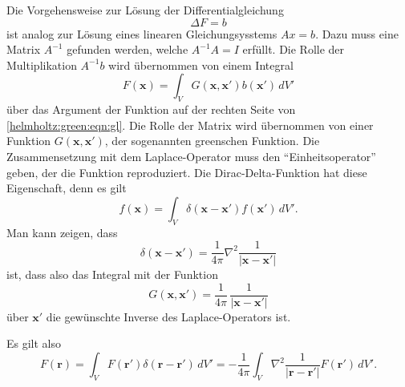 Die Vorgehensweise zur Lösung der Differentialgleichung
\begin{equation}
\Delta F = b
\label{helmholtz:green:eqn:gl}
\end{equation}
ist analog zur Lösung eines linearen Gleichungsysstems
$Ax=b$.
Dazu muss eine Matrix $A^{-1}$ gefunden werden, welche $A^{-1}A=I$
erfüllt.
Die Rolle der Multiplikation $A^{-1}b$ wird übernommen von einem
Integral
\[
F(\boldsymbol{x})
=
\int_V
G(\boldsymbol{x},\boldsymbol{x}')
b(\boldsymbol{x}')
\,dV'
\]
über das Argument der Funktion auf der rechten Seite von
\eqref{helmholtz:green:eqn:gl}.
Die Rolle der Matrix wird übernommen von einer Funktion
$G(\boldsymbol{x},\boldsymbol{x}')$, der sogenannten greenschen
Funktion.
Die Zusammensetzung mit dem Laplace-Operator muss den ``Einheitsoperator''
geben, der die Funktion reproduziert.
Die Dirac-Delta-Funktion hat diese Eigenschaft, denn es gilt
\[
f(\boldsymbol{x})
=
\int_V
\delta(\boldsymbol{x}-\boldsymbol{x}')
f(\boldsymbol{x}')
\,dV'.
\]
Man kann zeigen, dass 
\[
\delta(\boldsymbol{x}-\boldsymbol{x}')
=
\frac{1}{4\pi} \nabla^2 \frac{1}{|\boldsymbol{x}-\boldsymbol{x}'|}
\]
ist, dass also das Integral mit der Funktion
\[
G(\boldsymbol{x},\boldsymbol{x}')
=
\frac{1}{4\pi}\,
\frac{1}{|\boldsymbol{x}-\boldsymbol{x}'|}
\]
über $\boldsymbol{x}'$ die gewünschte Inverse des Laplace-Operators ist.
%
%

Es gilt also
\[
F(\boldsymbol{r})
=
\int_V
F(\boldsymbol{r}')
\delta(\boldsymbol{r}-\boldsymbol{r}')
\,dV'
=
-\frac{1}{4\pi}
\int_V
\nabla^2 \frac{1}{|\boldsymbol{r}-\boldsymbol{r}'|}
F(\boldsymbol{r}')
\,dV'.
\]


